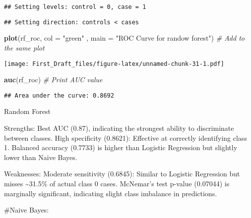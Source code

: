 \documentclass[
]{article}
\newenvironment{Shaded}{\begin{snugshade}}{\end{snugshade}}
\newcommand{\AttributeTok}[1]{\textcolor[rgb]{0.13,0.29,0.53}{#1}}
\newcommand{\CommentTok}[1]{\textcolor[rgb]{0.56,0.35,0.01}{\textit{#1}}}
\newcommand{\FloatTok}[1]{\textcolor[rgb]{0.00,0.00,0.81}{#1}}
\newcommand{\FunctionTok}[1]{\textcolor[rgb]{0.13,0.29,0.53}{\textbf{#1}}}
\newcommand{\NormalTok}[1]{#1}
\newcommand{\OtherTok}[1]{\textcolor[rgb]{0.56,0.35,0.01}{#1}}
\newcommand{\SpecialCharTok}[1]{\textcolor[rgb]{0.81,0.36,0.00}{\textbf{#1}}}
\newcommand{\StringTok}[1]{\textcolor[rgb]{0.31,0.60,0.02}{#1}}
\begin{document}
\begin{verbatim}
## Setting levels: control = 0, case = 1
\end{verbatim}

\begin{verbatim}
## Setting direction: controls < cases
\end{verbatim}

\begin{Shaded}
\begin{Highlighting}[]
\FunctionTok{plot}\NormalTok{(rf\_roc, }\AttributeTok{col =} \StringTok{"green"}\NormalTok{ , }\AttributeTok{main =} \StringTok{"ROC Curve for randow forest"}\NormalTok{)  }\CommentTok{\# Add to the same plot}
\end{Highlighting}
\end{Shaded}

\texttt{[image: First\_Draft\_files/figure-latex/unnamed-chunk-31-1.pdf]}

\begin{Shaded}
\begin{Highlighting}[]
\FunctionTok{auc}\NormalTok{(rf\_roc)  }\CommentTok{\# Print AUC value}
\end{Highlighting}
\end{Shaded}

\begin{verbatim}
## Area under the curve: 0.8692
\end{verbatim}

Random Forest

Strengths: Best AUC (0.87), indicating the strongest ability to
discriminate between classes. High specificity (0.8621): Effective at
correctly identifying class 1. Balanced accuracy (0.7733) is higher than
Logistic Regression but slightly lower than Naive Bayes.

Weaknesses: Moderate sensitivity (0.6845): Similar to Logistic
Regression but misses \textasciitilde31.5\% of actual class 0 cases.
McNemar's test p-value (0.07044) is marginally significant, indicating
slight class imbalance in predictions.

\#Naive Bayes:

\begin{Shaded}
\end{Shaded}
\end{document}
